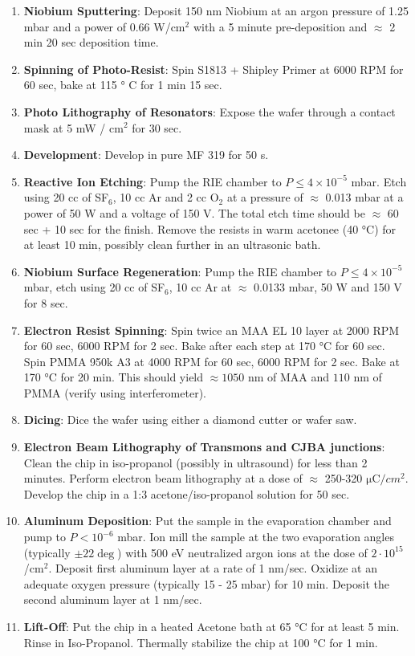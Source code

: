 \begin{enumerate}
\item \textbf{Niobium Sputtering}: Deposit 150 nm Niobium at an argon pressure of 1.25 mbar and a power of 0.66 W/cm$^2$ with a 5 minute pre-deposition and $\approx$ 2 min 20 sec deposition time.
\item \textbf{Spinning of Photo-Resist}: Spin S1813 + Shipley Primer at 6000 RPM for 60 sec, bake at 115 ° C for 1 min 15 sec.
\item \textbf{Photo Lithography of Resonators}: Expose the wafer through a contact mask at 5 mW / cm$^2$ for 30 sec.
\item \textbf{Development}: Develop in pure MF 319 for 50 s.
\item \textbf{Reactive Ion Etching}: Pump the RIE chamber to $P\le 4\times 10^{-5}$ mbar. Etch using 20 cc of SF$_6$, 10 cc Ar and 2 cc O$_2$ at a pressure of $\approx$ 0.013 mbar at a power of 50 W and a voltage of 150 V. The total etch time should be $\approx $ 60 sec + 10 sec for the finish. Remove the resists in warm acetonee (40 °C) for at least 10 min, possibly clean further in an ultrasonic bath.
\item \textbf{Niobium Surface Regeneration}: Pump the RIE chamber  to $P\le 4\times 10^{-5}$ mbar, etch using 20 cc of SF$_6$, 10 cc Ar at $\approx$ 0.0133 mbar, 50 W and 150 V for 8 sec.
\item \textbf{Electron Resist Spinning}: Spin twice an MAA EL 10 layer at 2000 RPM for 60 sec, 6000 RPM for 2 sec. Bake after each step at 170 °C for 60 sec. Spin PMMA 950k A3 at 4000 RPM for 60 sec, 6000 RPM for 2 sec. Bake at 170 °C for 20 min. This should yield $\approx 1050$ nm of MAA and $110$ nm of PMMA (verify using interferometer).
\item \textbf{Dicing}: Dice the wafer using either a diamond cutter or wafer saw.
\item \textbf{Electron Beam Lithography of Transmons and CJBA junctions}: Clean the chip in iso-propanol (possibly in ultrasound) for less than 2 minutes. Perform electron beam lithography at a dose of $\approx$ 250-320 $\mathrm{\mu C}/cm^2$. Develop the chip in a 1:3 acetone/iso-propanol solution for 50 sec.
\item \textbf{Aluminum Deposition}: Put the sample in the evaporation chamber and pump to $P<10^{-6}$ mbar. Ion mill the sample at the two evaporation angles (typically $\pm 22\deg$) with 500 eV neutralized argon ions at the dose of $2\cdot 10^{15}$/cm$^2$. Deposit first aluminum layer at a rate of 1 nm/sec. Oxidize at an adequate oxygen pressure (typically 15 - 25 mbar) for 10 min. Deposit the second aluminum layer at 1 nm/sec.
\item \textbf{Lift-Off}: Put the chip in a heated Acetone bath at 65 °C for at least 5 min. Rinse in Iso-Propanol. Thermally stabilize the chip at 100 °C for 1 min.
\end{enumerate}
